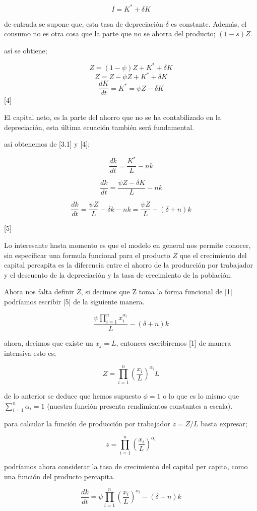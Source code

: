 \documentclass[12pt]{article}
\begin{document}
$$I=K^{*}+\delta K$$

de entrada se supone que, esta tasa de depreciación $\delta$ es constante. Además, el consumo no es otra cosa que la parte que no  se ahorra del producto; $(1-s)Z$.

así se obtiene;

$$Z= (1-\psi)Z+K^{*}+\delta K$$
$$Z=Z-\psi Z +K^{*}+\delta K$$
$$\dfrac{dK}{dt}=K^{*}= \psi Z - \delta K $$ [4]

El capital neto, es la parte del ahorro  que no se ha contabilizado en la depreciación, esta última ecuación también será fundamental.

así obtenemos de [3.1] y [4];


$$\dfrac{dk}{dt}=\dfrac{K^{*}}{L}-nk$$

$$\dfrac{dk}{dt}=\dfrac{\psi Z - \delta K}{L}-nk$$

$$\dfrac{dk}{dt}=\dfrac{\psi Z}{L}- \delta k -nk = \dfrac{\psi Z}{L}-(\delta  + n)k $$

[5]

Lo interesante hasta  momento es que el modelo en general nos permite conocer, sin especificar una formula funcional para el producto $Z$ que el crecimiento del capital percapita es la diferencia entre el ahorro de la producción por trabajador y el descuento de la depreciación y la tasa de crecimiento de la población. 




Ahora nos falta definir $Z$, si decimos que Z toma la forma funcional de [1] podríamos escribir [5] de la siguiente manera.

$$ \dfrac{ \psi \prod_{i=1}^nx_i^{\alpha_i} }{L}- (\delta + n)k$$

ahora, decimos que existe un $x_{j}=L$, entonces escribiremos [1] de manera intensiva esto es;


$$Z=\prod_{i=1}^{n}\left(\dfrac{x_i}{L}\right)^{\alpha_i}L$$

de lo anterior se deduce que hemos supuesto $\phi=1$ o lo que es lo mismo que $\sum_{i=1}^{n} \alpha_i =1$ (nuestra función presenta rendimientos constantes a escala).

para calcular la función de producción por trabajador $z=Z/L$ basta expresar; 

$$z=\prod_{i=1}^{n}\left(\dfrac{x_i}{L}\right)^{\alpha_i}$$


podríamos ahora considerar la tasa de crecimiento del capital per capita, como una función del producto percapita.

$$
\dfrac{dk}{dt}= \psi \prod_{i=1}^{n}\left(\dfrac{x_i}{L}\right)^{\alpha_i} -(\delta + n)k$$ 
\end{document}
